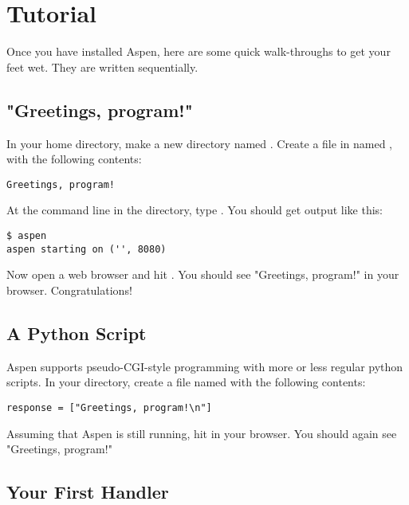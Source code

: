 \chapter{Tutorial \label{tutorial}}

Once you have installed Aspen, here are some quick walk-throughs to get your
feet wet. They are written sequentially.


\section{"Greetings, program!" \label{tutorial-greetings-program}}

In your home directory, make a new directory named . Create a
file in  named , with the following contents:

\begin{verbatim}
Greetings, program!
\end{verbatim}

At the command line in the  directory, type . You
should get output like this:

\begin{verbatim}
$ aspen
aspen starting on ('', 8080)
\end{verbatim}

Now open a web browser and hit . You should see
"Greetings, program!" in your browser. Congratulations!


\section{A Python Script \label{tutorial-pyscript}}

Aspen supports pseudo-CGI-style programming with more or less regular python
scripts. In your  directory, create a file named 
with the following contents:

\begin{verbatim}
response = ["Greetings, program!\n"]
\end{verbatim}

Assuming that Aspen is still running, hit  in
your browser. You should again see "Greetings, program!"


\section{Your First Handler \label{tutorial-handler}}

